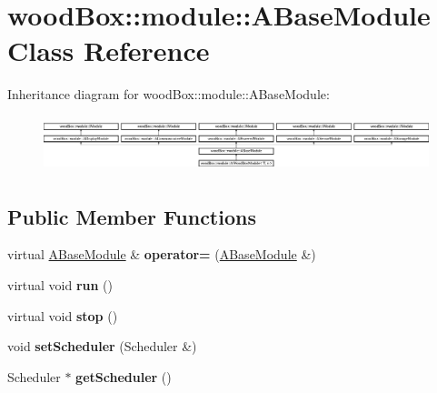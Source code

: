 \hypertarget{classwood_box_1_1module_1_1_a_base_module}{}\section{wood\+Box\+:\+:module\+:\+:A\+Base\+Module Class Reference}
\label{classwood_box_1_1module_1_1_a_base_module}
Inheritance diagram for wood\+Box\+:\+:module\+:\+:A\+Base\+Module\+:\begin{figure}[H]
\begin{center}
\leavevmode
\includegraphics[height=1.635036cm]{classwood_box_1_1module_1_1_a_base_module}
\end{center}
\end{figure}
\subsection*{Public Member Functions}
\begin{DoxyCompactItemize}
\item 
\mbox{\label{classwood_box_1_1module_1_1_a_base_module_a8997e5765ffb9ad996d57d0dddea93e4}} 
virtual \mbox{\hyperlink{classwood_box_1_1module_1_1_a_base_module}{A\+Base\+Module}} \& {\bfseries operator=} (\mbox{\hyperlink{classwood_box_1_1module_1_1_a_base_module}{A\+Base\+Module}} \&)
\item 
\mbox{\label{classwood_box_1_1module_1_1_a_base_module_a3be59fd4669740f9b7db7af31d676dfc}} 
virtual void {\bfseries run} ()
\item 
\mbox{\label{classwood_box_1_1module_1_1_a_base_module_ab11ff2fcd98e85183dfbd450e74258fe}} 
virtual void {\bfseries stop} ()
\item 
\mbox{\label{classwood_box_1_1module_1_1_a_base_module_a94f45796ed7680f7106bceb63d6ac5b9}} 
void {\bfseries set\+Scheduler} (Scheduler \&)
\item 
\mbox{\label{classwood_box_1_1module_1_1_a_base_module_a33b55cc0db87727adb0d087b2362b938}} 
Scheduler $\ast$ {\bfseries get\+Scheduler} ()
\end{DoxyCompactItemize}
